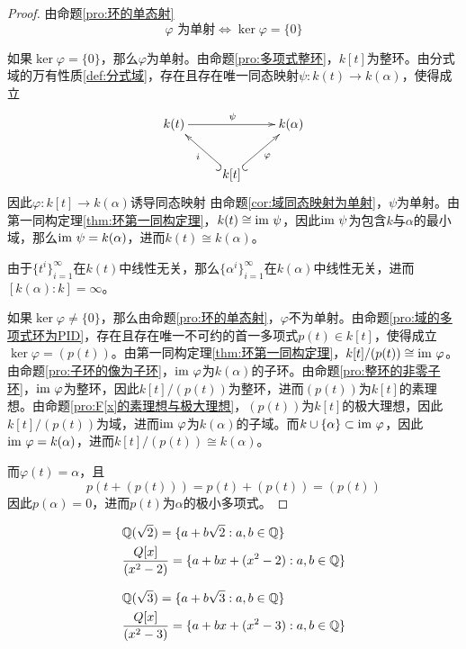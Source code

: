 \begin{proof}
	由命题\ref{pro:环的单态射}%
	$$
	\varphi\text{ 为单射}\iff \ker\varphi=\{0\}
	$$
	
	如果$\ker\varphi=\{0\}$，那么$\varphi$为单射。由命题\ref{pro:多项式整环}，$k[t]$为整环。由分式域的万有性质\ref{def:分式域}，存在且存在唯一同态映射$\psi:k(t)\to k(\alpha)$，使得成立
	$$
	\xymatrix{
		k(t) \ar[rr]^{\psi}  & & k(\alpha) \\
		& k[t] \ar@{^(->}[ul]^{i} \ar@{_(->}[ur]_{\varphi}
	}
	$$
	因此$\varphi:k[t]\to k(\alpha)$诱导同态映射
	由命题\ref{cor:域同态映射为单射}，$\psi$为单射。由第一同构定理\ref{thm:环第一同构定理}，$k(t)\cong \text{im }\psi$，因此$\text{im }\psi$为包含$k$与$\alpha$的最小域，那么$\text{im }\psi=k(\alpha)$，进而$k(t)\cong k(\alpha)$。
	
	由于$\{ t^i \}_{i=1}^{\infty}$在$k(t)$中线性无关，那么$\{ \alpha^i \}_{i=1}^{\infty}$在$k(\alpha)$中线性无关，进而$[k(\alpha):k]=\infty$。
	
	如果$\ker\varphi\ne \{0\}$，那么由命题\ref{pro:环的单态射}，$\varphi$不为单射。由命题\ref{pro:域的多项式环为PID}，存在且存在唯一不可约的首一多项式$p(t)\in k[t]$，使得成立$\ker\varphi=(p(t))$。由第一同构定理\ref{thm:环第一同构定理}，$k[t]/(p(t))\cong \text{im }\varphi$。由命题\ref{pro:子环的像为子环}，$\text{im }\varphi$为$k(\alpha)$的子环。由命题\ref{pro:整环的非零子环}，$\text{im }\varphi$为整环，因此$k[t]/(p(t))$为整环，进而$(p(t))$为$k[t]$的素理想。由命题\ref{pro:F[x]的素理想与极大理想}，$(p(t))$为$k[t]$的极大理想，因此$k[t]/(p(t))$为域，进而$\text{im }\varphi$为$k(\alpha)$的子域。而$k\cup\{\alpha\}\subset\text{im }\varphi$，因此$\text{im }\varphi=k(\alpha)$，进而$k[t]/(p(t))\cong k(\alpha)$。
	
	而$\varphi(t)=\alpha$，且%
	$$
	p(t+(p(t)))=p(t)+(p(t))=(p(t))
	$$
	因此$p(\alpha)=0$，进而$p(t)$为$\alpha$的极小多项式。
\end{proof}

\begin{example}
	\begin{align*}
		& \mathbb{Q}(\sqrt{2})=\{ a+b\sqrt{2}:a,b\in\mathbb{Q} \}\\
		& \frac{Q[x]}{(x^2-2)}=\{ a+bx+(x^2-2):a,b\in\mathbb{Q} \}
	\end{align*}
\end{example}

\begin{example}
	\begin{align*}
		& \mathbb{Q}(\sqrt{3})=\{ a+b\sqrt{3}:a,b\in\mathbb{Q} \}\\
		& \frac{Q[x]}{(x^2-3)}=\{ a+bx+(x^2-3):a,b\in\mathbb{Q} \}
	\end{align*}
\end{example}

